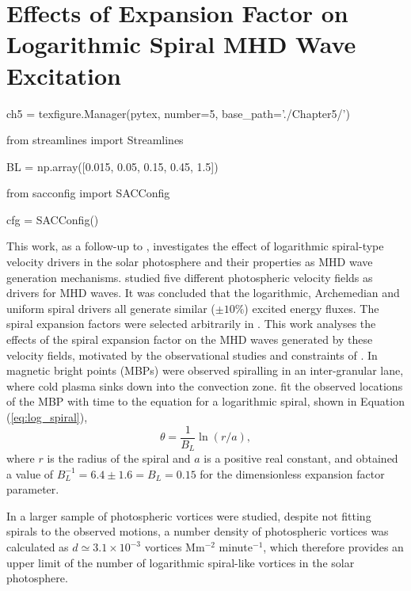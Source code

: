 
\chapter{Effects of Expansion Factor on Logarithmic Spiral MHD Wave Excitation}

\begin{pycode}[chapter5]
ch5 = texfigure.Manager(pytex, number=5, base_path='./Chapter5/')

from streamlines import Streamlines

BL = np.array([0.015, 0.05, 0.15, 0.45, 1.5])

from sacconfig import SACConfig

cfg = SACConfig()
\end{pycode}

This work, as a follow-up to \cite{mumford2015}, investigates the effect of logarithmic spiral-type velocity drivers in the solar photosphere and their properties as MHD wave generation mechanisms.
\cite{mumford2015} studied five different photospheric velocity fields as drivers for MHD waves.
It was concluded that the logarithmic, Archemedian and uniform spiral drivers all generate similar ($\pm 10\%$) excited energy fluxes.
The spiral expansion factors were selected arbitrarily in \cite{mumford2015}.
This work analyses the effects of the spiral expansion factor on the MHD waves generated by these velocity fields, motivated by the observational studies and constraints of \cite{bonet2008}.
In \cite{bonet2008} magnetic bright points (MBPs) were observed spiralling in an inter-granular lane, where cold plasma sinks down into the convection zone.
\cite{bonet2008} fit the observed locations of the MBP with time to the equation for a logarithmic spiral, shown in Equation (\ref{eq:log_spiral}),
\begin{equation}
\theta = \frac{1}{B_L}\ln(r/a),
\label{eq:log_spiral}
\end{equation}
where $r$ is the radius of the spiral and $a$ is a positive real constant, and obtained a value of $B_L^{-1} = 6.4 \pm 1.6 = B_L = 0.15$ for the dimensionless expansion factor parameter.

In \cite{bonet2010} a larger sample of photospheric vortices were studied, despite not fitting spirals to the observed motions, a number density of photospheric vortices was calculated as $d \simeq 3.1 \times 10^{-3}$ vortices Mm$^{-2}$ minute$^{-1}$, which therefore provides an upper limit of the number of logarithmic spiral-like vortices in the solar photosphere.

